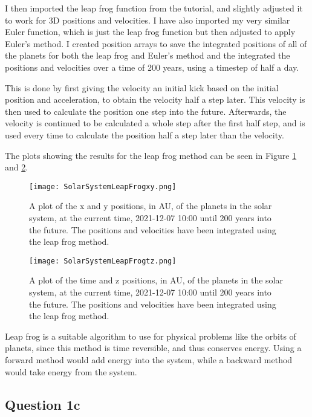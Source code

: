 I then imported the leap frog function from the tutorial, and slightly adjusted it to work for 3D positions and velocities.
I have also imported my very similar Euler function, which is just the leap frog function but then adjusted to apply Euler's method.
I created position arrays to save the integrated positions of all of the planets for both the leap frog and Euler's method and the integrated the positions and velocities over a time of 200 years, using a timestep of half a day.

This is done by first giving the velocity an initial kick based on the initial position and acceleration, to obtain the velocity half a step later.
This velocity is then used to calculate the position one step into the future.
Afterwards, the velocity is continued to be calculated a whole step after the first half step, and is used every time to calculate the position half a step later than the velocity.

The plots showing the results for the leap frog method can be seen in Figure \ref{fig:LFxy} and \ref{fig:LFtz}.

\begin{figure}[ht!]
  \centering
  \texttt{[image: SolarSystemLeapFrogxy.png]}
  \caption{A plot of the x and y positions, in AU, of the planets in the solar system, at the current time, 2021-12-07 10:00 until 200 years into the future. The positions and velocities have been integrated using the leap frog method.}
  \label{fig:LFxy}
\end{figure}

\begin{figure}[ht!]
  \centering
  \texttt{[image: SolarSystemLeapFrogtz.png]}
  \caption{A plot of the time and z positions, in AU, of the planets in the solar system, at the current time, 2021-12-07 10:00 until 200 years into the future. The positions and velocities have been integrated using the leap frog method.}
  \label{fig:LFtz}
\end{figure}

Leap frog is a suitable algorithm to use for physical problems like the orbits of planets, since this method is time reversible, and thus conserves energy.
Using a forward method would add energy into the system, while a backward method would take energy from the system. 

\subsection{Question 1c}

